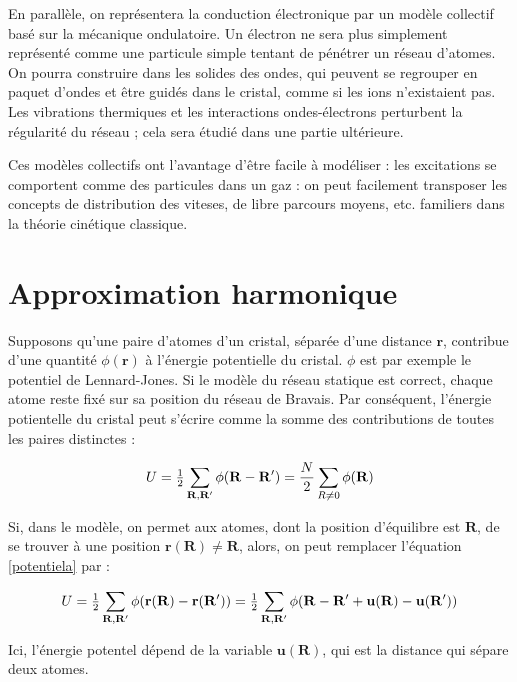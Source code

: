 En parallèle, on représentera la conduction électronique par un modèle collectif
basé sur la mécanique ondulatoire. Un électron ne sera plus simplement représenté
comme une particule simple tentant de pénétrer un réseau d'atomes.
On pourra construire dans les solides des ondes, qui peuvent se regrouper en
paquet d'ondes et être guidés dans le cristal, comme si les ions
n'existaient pas. Les vibrations thermiques et les interactions ondes-électrons
perturbent la régularité du réseau ; cela sera étudié dans une partie
ultérieure.

Ces modèles collectifs ont l'avantage d'être facile à modéliser : les
excitations se comportent comme des particules dans un gaz : on peut facilement 
transposer les concepts de distribution des viteses, de libre parcours moyens, 
etc. familiers dans la théorie cinétique classique.


\section{Approximation harmonique}

Supposons qu'une paire d'atomes d'un cristal, séparée d'une distance
$\mathbf{r}$, contribue d'une quantité $\phi(\mathbf{r})$ à l'énergie
potentielle du cristal. $\phi$ est par exemple le potentiel de Lennard-Jones.
Si le modèle du réseau statique est correct, chaque atome reste fixé sur
sa position du réseau de Bravais. Par conséquent, l'énergie potientelle du
cristal peut s'écrire comme la somme des contributions de toutes les paires
distinctes :

\begin{equation}
    U = \mbox{$\frac{1}{2}$} \sum_{\mathbf{R,R'}} \phi(\mathbf{R-R'}) = \frac{N}{2} \sum_{R\neq0} \phi(\mathbf{R})
    \label{potentiela} 
\end{equation}

Si, dans le modèle, on permet aux atomes, dont la position d'équilibre est
$\mathbf{R}$, de se trouver à une position $\mathbf{r(R)} \neq \mathbf{R}$,
alors, on peut remplacer l'équation \ref{potentiela} par :

\begin{equation}
    U = \mbox{$\frac{1}{2}$} \sum_{\mathbf{R,R'}} \phi(\mathbf{r(R) - r(R')})
    = \mbox{$\frac{1}{2}$} \sum_{\mathbf{R,R'}} \phi(\mathbf{R - R' + u(R) - u(R')})
    \label{potentielu}
\end{equation}

Ici, l'énergie potentel dépend de la variable $\mathbf{u(R)}$, qui est la
distance qui sépare deux atomes.

